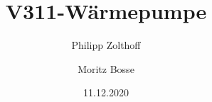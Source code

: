 

\author{Philipp Zolthoff \and Moritz Bosse}
\title{V311-Wärmepumpe}
\date{11.12.2020}



\begin{minipage}{\textwidth}
\maketitle
\tableofcontents

\end{minipage}
\ignorespacesafterend
\newpage







\newpage


\printbibliography




